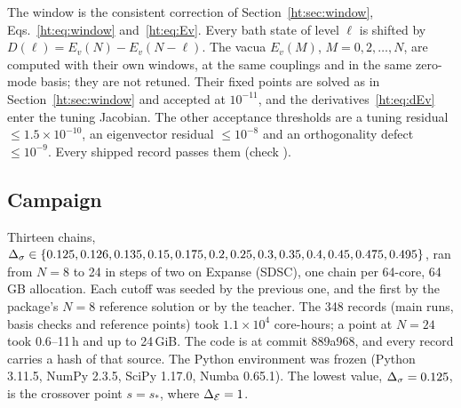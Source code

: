 The window is the consistent correction of Section~\ref{ht:sec:window}, Eqs.~\eqref{ht:eq:window} and~\eqref{ht:eq:Ev}. Every
bath state of level $\ell$ is shifted by $D(\ell)=E_v(N)-E_v(N-\ell)$. The vacua $E_v(M)$, $M=0,2,\dots,N$, are computed
with their own windows, at the same couplings and in the same zero-mode basis; they are not retuned. Their fixed points
are solved as in Section~\ref{ht:sec:window} and accepted at $10^{-11}$, and the derivatives~\eqref{ht:eq:dEv} enter the
tuning Jacobian. The other acceptance thresholds are a tuning residual $\le1.5\times10^{-10}$, an eigenvector residual
$\le10^{-8}$ and an orthogonality defect $\le10^{-9}$. Every shipped record passes them (check ).

\subsection{Campaign}\label{ht:d2:campaign}
Thirteen chains, $\Delta_\sigma\in\{0.125,0.126,0.135,0.15,0.175,0.2,0.25,0.3,0.35,0.4,0.45,0.475,0.495\}$, ran from $N=8$ to 24
in steps of two on Expanse (SDSC), one chain per 64-core, 64\,GB allocation. Each cutoff was seeded by the previous one,
and the first by the package's $N=8$ reference solution or by the teacher. The 348 records (main runs, basis checks and
reference points) took $1.1\times10^4$ core-hours; a point at $N=24$ took 0.6--11\,h and up to 24\,GiB. The code is
 at commit 889a968, and every record carries a hash of that source. The Python environment
was frozen (Python 3.11.5, NumPy 2.3.5, SciPy 1.17.0, Numba 0.65.1). The lowest value, $\Delta_\sigma=0.125$, is the crossover
point $s=s_*$, where $\Delta_{\mathcal E}=1$.

